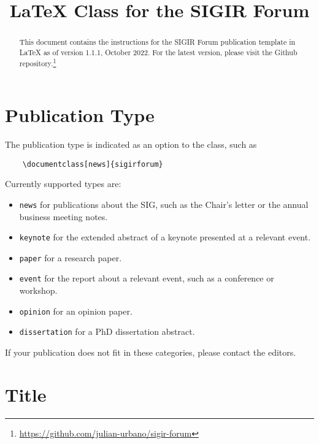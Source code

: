 \documentclass[news]{sigirforum}
\begin{document}
\title{\LaTeX\xspace Class for the SIGIR Forum}


\maketitle 
\begin{abstract}
This document contains the instructions for the SIGIR Forum publication template in \LaTeX\xspace as of version 1.1.1, October 2022. For the latest version, please visit the Github repository.\footnote{\url{https://github.com/julian-urbano/sigir-forum}}
\end{abstract}

\section{Publication Type}

The publication type is indicated as an option to the class, such as
\begin{verbatim}
    \documentclass[news]{sigirforum}
\end{verbatim}
Currently supported types are:
\begin{itemize}
	\item \texttt{news} for publications about the SIG, such as the Chair's letter or the annual business meeting notes.
	\item \texttt{keynote} for the extended abstract of a keynote presented at a relevant event.
	\item \texttt{paper} for a research paper.
	\item \texttt{event} for the report about a relevant event, such as a conference or workshop.
	\item \texttt{opinion} for an opinion paper.
	\item \texttt{dissertation} for a PhD dissertation abstract.
\end{itemize}

If your publication does not fit in these categories, please contact the editors.

\section{Title}
\end{document}

